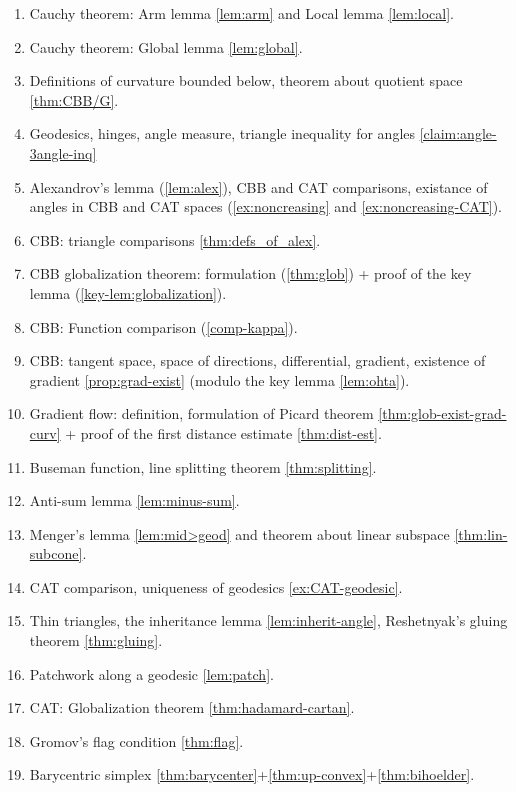 \begin{enumerate}
\item Cauchy theorem: Arm lemma \ref{lem:arm} and Local lemma \ref{lem:local}.
\item Cauchy theorem: Global lemma \ref{lem:global}.
\item Definitions of curvature bounded below, theorem about quotient space \ref{thm:CBB/G}.
\item Geodesics, hinges, angle measure, triangle inequality for angles \ref{claim:angle-3angle-inq}
\item Alexandrov's lemma (\ref{lem:alex}), CBB and CAT comparisons,
existance of angles in CBB and CAT spaces (\ref{ex:noncreasing} and \ref{ex:noncreasing-CAT}).
\item CBB: triangle comparisons \ref{thm:defs_of_alex}.
\item CBB globalization theorem: formulation (\ref{thm:glob})  + proof of the key lemma (\ref{key-lem:globalization}). 
\item CBB: Function comparison (\ref{comp-kappa}).
\item CBB: tangent space, space of directions, differential, gradient, existence of gradient \ref{prop:grad-exist} (modulo the key lemma \ref{lem:ohta}).
\item Gradient flow: definition, formulation of Picard theorem \ref{thm:glob-exist-grad-curv} + proof of the first distance estimate \ref{thm:dist-est}.
\item Buseman function, line splitting theorem \ref{thm:splitting}.
\item Anti-sum lemma \ref{lem:minus-sum}.
\item Menger’s lemma \ref{lem:mid>geod} and theorem about linear subspace \ref{thm:lin-subcone}.
\item CAT comparison, uniqueness of geodesics \ref{ex:CAT-geodesic}.
\item Thin triangles, the inheritance lemma \ref{lem:inherit-angle}, Reshetnyak's gluing theorem \ref{thm:gluing}.
\item Patchwork along a geodesic \ref{lem:patch}.
\item CAT: Globalization theorem \ref{thm:hadamard-cartan}.
\item Gromov's flag condition \ref{thm:flag}.
\item Barycentric simplex \ref{thm:barycenter}+\ref{thm:up-convex}+\ref{thm:bihoelder}.
\end{enumerate}

